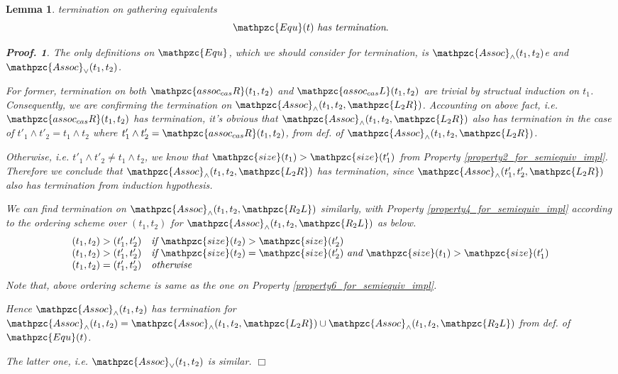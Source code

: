 \documentclass[12pt]{article}
\newtheorem{Lemma}{Lemma}[section]
\newtheorem{Proof}{Proof.}
\begin{document}
\begin{Lemma}{termination on gathering equivalents}
  \[ \mathpzc{Equ}(t)\ \text{\it has termination}.
  \]
  \begin{Proof}
    The only definitions on $\mathpzc{Equ}$, which we should consider
    for termination, is $\mathpzc{Assoc}_\wedge(t_1, t_2)$e and
    $\mathpzc{Assoc}_\vee(t_1, t_2)$.
    
    For former, termination on both $\mathpzc{assoc_{cas}R}(t_1, t_2)$ and
    $\mathpzc{assoc_{cas}L}(t_1, t_2)$ are trivial by structual induction
    on $t_1$.
    Consequently, we are confirming the termination on
    $\mathpzc{Assoc}_\wedge(t_1, t_2, \mathpzc{L_2R})$.
    Accounting on above fact, i.e. $\mathpzc{assoc_{cas}R}(t_1, t_2)$
    has termination, it's obvious that
    $\mathpzc{Assoc}_\wedge(t_1, t_2, \mathpzc{L_2R})$ also has termination
    in the case of $t'_1 \wedge t'_2 = t_1 \wedge t_2$ where
    $t'_1 \wedge t'_2 = \mathpzc{assoc_{cas}R}(t_1, t_2)$, from
    def. of $\mathpzc{Assoc}_\wedge(t_1, t_2, \mathpzc{L_2R})$.
    
    Otherwise, i.e. $t'_1 \wedge t'_2 \neq t_1 \wedge t_2$, we know that
    $\mathpzc{size}(t_1) > \mathpzc{size}(t'_1)$ from Property
    \ref{property2_for_semiequiv_impl}. Therefore we conclude that
    $\mathpzc{Assoc}_\wedge(t_1, t_2, \mathpzc{L_2R})$ has
    termination, since $\mathpzc{Assoc}_\wedge(t'_1, t'_2, \mathpzc{L_2R})$
    also has termination from induction hypothesis.

    We can find termination on
    $\mathpzc{Assoc}_\wedge(t_1, t_2, \mathpzc{R_2L})$ similarly, with
    Property \ref{property4_for_semiequiv_impl} according to the
    ordering scheme over $(t_1, t_2)$ for
    $\mathpzc{Assoc}_\wedge(t_1, t_2, \mathpzc{R_2L})$ as below.
    \[ \begin{array}{l}
      (t_1, t_2) > (t'_1, t'_2) \quad
       \text{\it if}\ \mathpzc{size}(t_2) > \mathpzc{size}(t'_2)  \\
      (t_1, t_2) > (t'_1, t'_2) \quad
       \text{\it if}\ \mathpzc{size}(t_2) = \mathpzc{size}(t'_2)\
        \text{\it and}\ \mathpzc{size}(t_1) > \mathpzc{size}(t'_1)  \\
      (t_1, t_2) = (t'_1, t'_2) \quad \text{\it otherwise}
    \end{array}
    \]
    Note that, above ordering scheme is same as the one on Property
    \ref{property6_for_semiequiv_impl}.
    
    Hence $\mathpzc{Assoc}_\wedge(t_1, t_2)$ has termination for
    $\mathpzc{Assoc}_\wedge(t_1, t_2) =
    \mathpzc{Assoc}_\wedge(t_1, t_2, \mathpzc{L_2R}) \cup
    \mathpzc{Assoc}_\wedge(t_1, t_2, \mathpzc{R_2L})$ from def. of
    $\mathpzc{Equ}(t)$.
    
    The latter one, i.e. $\mathpzc{Assoc}_\vee(t_1, t_2)$ is similar.
    $\Box$
  \end{Proof}
\end{Lemma}
\end{document}
